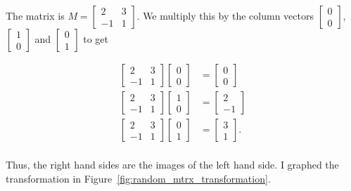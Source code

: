 \documentclass[../key.tex]{subfiles}
\begin{document}
The matrix is $M=\begin{bmatrix} 2 & 3 \\ -1 & 1 \end{bmatrix}$. We multiply this by the column vectors $\begin{bmatrix} 0 \\ 0 \end{bmatrix}$, $\begin{bmatrix} 1 \\ 0 \end{bmatrix}$ and $\begin{bmatrix} 0 \\ 1 \end{bmatrix}$ to get

\begin{align*}
\begin{bmatrix} 2 & 3 \\ -1 & 1 \end{bmatrix}\begin{bmatrix} 0 \\ 0 \end{bmatrix} &= \begin{bmatrix} 0 \\ 0 \end{bmatrix} \\
\begin{bmatrix} 2 & 3 \\ -1 & 1 \end{bmatrix}\begin{bmatrix} 1 \\ 0 \end{bmatrix} &= \begin{bmatrix} 2 \\ -1 \end{bmatrix} \\
\begin{bmatrix} 2 & 3 \\ -1 & 1 \end{bmatrix}\begin{bmatrix} 0 \\ 1 \end{bmatrix} &= \begin{bmatrix} 3 \\ 1 \end{bmatrix}. \\
\end{align*}

Thus, the right hand sides are the images of the left hand side. I graphed the transformation in Figure~\ref{fig:random_mtrx_transformation}.
\end{document}
